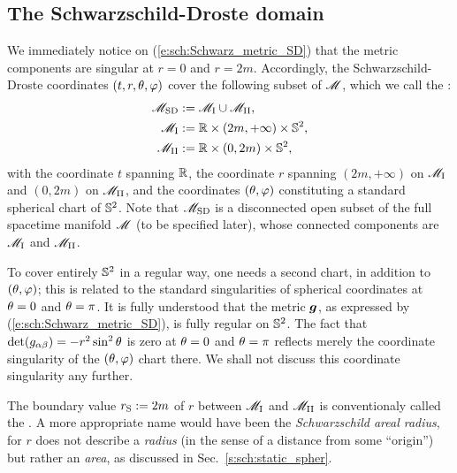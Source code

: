 \subsection{The Schwarzschild-Droste domain} \label{s:sch:SD_domain}

We immediately notice on (\ref{e:sch:Schwarz_metric_SD}) that the metric
components are singular at $r=0$ and $r=2m$. Accordingly, the Schwarzschild-Droste coordinates $(t,r,\theta,\varphi)$ cover the following subset of $\mathscr{M}$, which we call the
:
\begin{subequations}
\begin{align}
    \mathscr{M}_{\rm SD} & :=  \mathscr{M}_{\rm I} \cup \mathscr{M}_{\rm II} , \\
    \mathscr{M}_{\rm I} & :=  \mathbb{R}\times(2m,+\infty)\times\mathbb{S}^2 ,\\
    \mathscr{M}_{\rm II} & :=  \mathbb{R}\times(0,2m)\times\mathbb{S}^2 ,
\end{align}
\end{subequations}
with the coordinate $t$ spanning $\mathbb{R}$, the coordinate $r$ spanning $(2m,+\infty)$
on $\mathscr{M}_{\rm I}$ and $(0,2m)$ on $\mathscr{M}_{\rm II}$, and the coordinates $(\theta,\varphi)$
constituting a standard spherical chart of $\mathbb{S}^2$.
Note that $\mathscr{M}_{\rm SD}$ is a disconnected open subset of the full spacetime
manifold $\mathscr{M}$ (to be specified later), whose connected components are
$\mathscr{M}_{\rm I}$ and $\mathscr{M}_{\rm II}$.

\begin{remark}
To cover entirely $\mathbb{S}^2$ in a regular way, one needs a second chart, in
addition to $(\theta,\varphi)$; this is related to the standard singularities of
spherical coordinates at $\theta=0$ and $\theta=\pi$. It is fully understood
that the metric $\bm{g}$, as expressed by (\ref{e:sch:Schwarz_metric_SD}), is
fully regular on $\mathbb{S}^2$. The fact that $\det(g_{\alpha\beta}) = -r^2\sin^2\theta$ is zero
at $\theta=0$ and $\theta=\pi$ reflects merely the coordinate singularity
of the $(\theta,\varphi)$ chart there. We shall not discuss this coordinate singularity
any further.
\end{remark}

The boundary value $r_{\rm S}:= 2m$ of $r$ between $\mathscr{M}_{\rm I}$ and $\mathscr{M}_{\rm II}$
is conventionaly called the .
A more appropriate name would have been the \emph{Schwarzschild areal radius},
for $r$ does not describe a \emph{radius} (in the sense of a distance from
some ``origin'') but rather an \emph{area}, as discussed in Sec.~\ref{s:sch:static_spher}.

